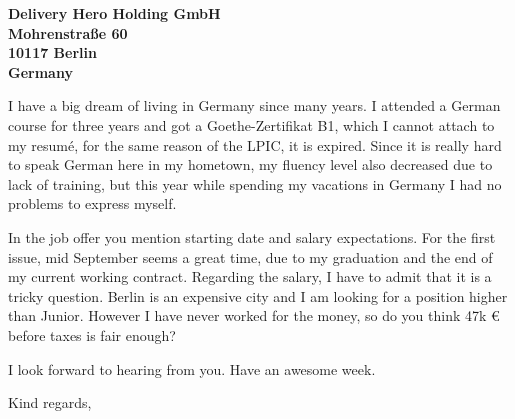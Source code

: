 \documentclass[a4paper]{willianpaixao-resume}
\begin{document}
\begin{letter}{\bfseries
Delivery Hero Holding GmbH\\Mohrenstraße 60\\10117 Berlin\\Germany}

I have a big dream of living in Germany since many years. I attended a German
course for three years and got a Goethe-Zertifikat B1, which I cannot attach to
my resumé, for the same reason of the LPIC, it is expired. Since it is really
hard to speak German here in my hometown, my fluency level also decreased due to
lack of training, but this year while spending my vacations in Germany I had no
problems to express myself.

In the job offer you mention starting date and salary expectations. For the
first issue, mid September seems a great time, due to my graduation and the end
of my current working contract. Regarding the salary, I have to admit that it is
a tricky question. Berlin is an expensive city and I am looking for a position
higher than Junior. However I have never worked for the money, so do you think
47k € before taxes is fair enough?

I look forward to hearing from you. Have an awesome week.
\closing{Kind regards,}
\end{letter}
\end{document}
